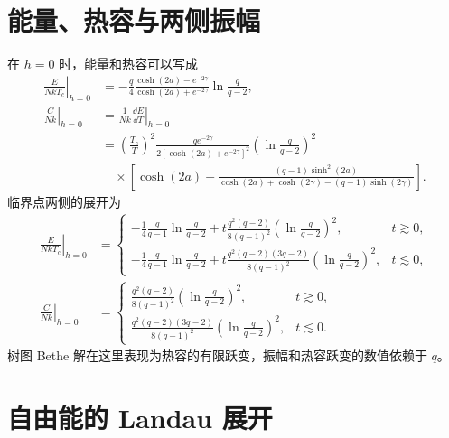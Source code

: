 \section{能量、热容与两侧振幅}

在 \(h=0\) 时，能量和热容可以写成
\begin{align*}
\left.\frac{E}{NkT_c}\right|_{h=0}
&=-\frac q4
\frac{\cosh(2a)-e^{-2\gamma}}
{\cosh(2a)+e^{-2\gamma}}
\ln\frac q{q-2},\\
\left.\frac{C}{Nk}\right|_{h=0}
&=\left.\frac1{Nk}\frac{\dd E}{\dd T}\right|_{h=0}\\
&=\left(\frac{T_c}{T}\right)^2
\frac{qe^{-2\gamma}}
{2\left[\cosh(2a)+e^{-2\gamma}\right]^2}
\left(\ln\frac q{q-2}\right)^2\\
&\quad\times\left[
\cosh(2a)+
\frac{(q-1)\sinh^2(2a)}
{\cosh(2a)+\cosh(2\gamma)-(q-1)\sinh(2\gamma)}
\right].
\end{align*}
临界点两侧的展开为
\begin{align*}
\left.\frac{E}{NkT_c}\right|_{h=0}
&=
\begin{cases}
\displaystyle-\frac14\frac q{q-1}\ln\frac q{q-2}
+t\frac{q^2(q-2)}{8(q-1)^2}
\left(\ln\frac q{q-2}\right)^2,&t\gtrsim0,\\[6pt]
\displaystyle-\frac14\frac q{q-1}\ln\frac q{q-2}
+t\frac{q^2(q-2)(3q-2)}{8(q-1)^2}
\left(\ln\frac q{q-2}\right)^2,&t\lesssim0,
\end{cases}\\
\left.\frac{C}{Nk}\right|_{h=0}
&=
\begin{cases}
\displaystyle
\frac{q^2(q-2)}{8(q-1)^2}
\left(\ln\frac q{q-2}\right)^2,&t\gtrsim0,\\[6pt]
\displaystyle
\frac{q^2(q-2)(3q-2)}{8(q-1)^2}
\left(\ln\frac q{q-2}\right)^2,&t\lesssim0.
\end{cases}
\end{align*}
树图 Bethe 解在这里表现为热容的有限跃变，振幅和热容跃变的数值依赖于 \(q\)。

\section{自由能的 Landau 展开}

